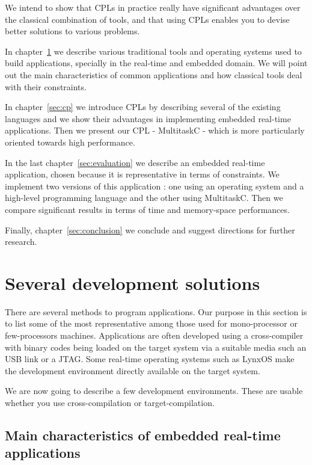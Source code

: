 \documentclass[10pt]{report}
\begin{document}
We intend to show that CPLs in practice really have significant
advantages over the classical combination of tools, and that using
CPLs enables you to devise better solutions to various problems.

In chapter~\ref{sec:related} we describe various traditional tools
and operating systems used to build applications, specially in
the real-time and embedded domain. We will point out the main
characteristics of common applications and how classical tools
deal with their constraints.

In chapter~\ref{sec:cp} we introduce CPLs by describing several of
the existing languages and we show their advantages in
implementing embedded real-time applications. Then we present our
CPL - MultitaskC - which is more particularly oriented towards
high performance.

In the last chapter~\ref{sec:evaluation} we describe an embedded
real-time application, chosen because it is representative in
terms of constraints. We implement two versions of this
application : one using an operating system and a
high-level programming language and the other using MultitaskC.
Then we compare significant results in terms of time and
memory-space performances.

Finally, chapter~\ref{sec:conclusion} we conclude and suggest
directions for further research.

\chapter{Several development solutions}
\label{sec:related}

There are several methods to program applications. Our purpose in
this section is to list some of the most representative among
those used for mono-processor or few-processors machines.
Applications are often developed using a cross-compiler with
binary codes being loaded on the target system via a suitable
media such an USB link or a JTAG. Some real-time operating
systems such as LynxOS make the development environment directly
available on the target system.

We are now going to describe a few development environments.
These are usable whether you use cross-compilation or
target-compilation.

\section{Main characteristics of embedded real-time applications}
\end{document}
